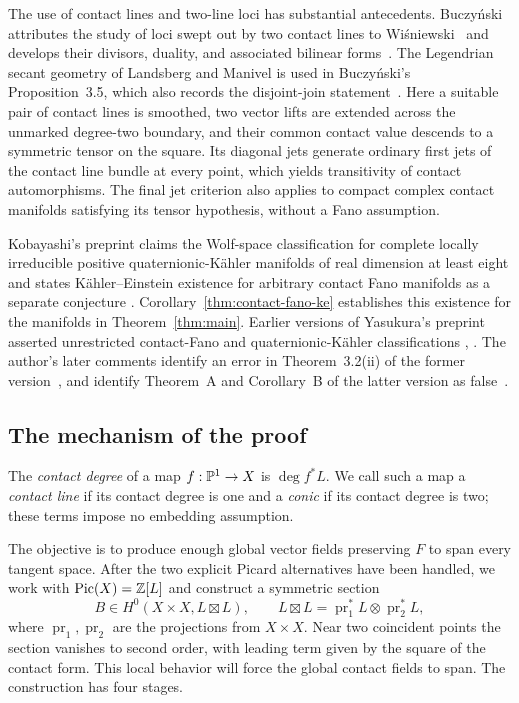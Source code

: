 The use of contact lines and two-line loci has substantial antecedents.
Buczy\'nski attributes the study of loci swept out by two contact lines to
Wi\'sniewski~\cite[Introduction]{Buczynski2010} and develops their divisors, duality, and
associated bilinear forms~\cite[Introduction and Theorem~1.3]{Buczynski2010}.
The Legendrian secant geometry of Landsberg and Manivel
\cite[Proposition~17(2) and its proof]{LandsbergManivel2007}
is used in Buczy\'nski's Proposition~3.5, which also records the
disjoint-join statement~\cite{Buczynski2010}.
Here a suitable pair of contact lines is smoothed, two vector lifts are
extended across the unmarked degree-two boundary, and their common contact
value descends to a symmetric tensor on the square.  Its diagonal jets
generate ordinary first jets of the contact line bundle at every point,
which yields transitivity of contact automorphisms.  The final jet criterion
also applies to compact complex contact manifolds satisfying its tensor
hypothesis, without a Fano assumption.

Kobayashi's preprint claims the Wolf-space classification for complete
locally irreducible positive quaternionic-K\"ahler manifolds of real
dimension at least eight
\cite[Theorem~5.3]{Kobayashi2008} and states K\"ahler--Einstein existence
for arbitrary contact Fano manifolds as a separate conjecture
\cite[Conjecture~1.3]{Kobayashi2008}. Corollary~\ref{thm:contact-fano-ke}
establishes this existence for the manifolds in Theorem~\ref{thm:main}.
Earlier versions of Yasukura's preprint asserted unrestricted contact-Fano
and quaternionic-K\"ahler classifications
\cite[Theorem~I and Corollary~II]{Yasukura2009v3},
\cite[Theorems~C--D and Corollary~E]{Yasukura2022v11}.
The author's later comments identify an error in Theorem~3.2(ii) of the
former version~\cite{Yasukura2009v4}, and identify Theorem~A and
Corollary~B of the latter version as false~\cite{Yasukura2023v12}.


\subsection*{The mechanism of the proof}

The \emph{contact degree} of a map $f:\mathbb P^1\to X$ is
$\deg f^*L$. We call such a map a \emph{contact line} if its contact
degree is one and a \emph{conic} if its contact degree is two; these
terms impose no embedding assumption.

The objective is to produce enough global vector fields preserving
$F$ to span every tangent space. After the two explicit Picard
alternatives have been handled, we work with $\operatorname{Pic}(X)=\mathbb Z[L]$ and
construct a symmetric section
\begin{equation}\label{intro:global-section}
 B\in H^0(X\times X,L\boxtimes L),\qquad
 L\boxtimes L=\operatorname{pr}_1^*L\otimes\operatorname{pr}_2^*L,
\end{equation}
where $\operatorname{pr}_1,\operatorname{pr}_2$ are the projections
from $X\times X$. Near two coincident points the section vanishes
to second order, with leading term given by the square of the
contact form. This local behavior will force the global contact
fields to span. The construction has four stages.

